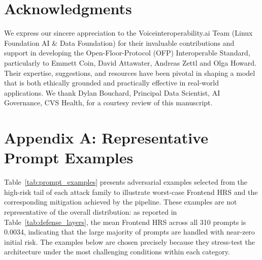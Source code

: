 \documentclass[11pt,a4paper]{article}
\begin{document}
\section*{Acknowledgments}
	We express our sincere appreciation to the Voiceinteroperability.ai \cite{ovoninter} Team (Linux Foundation AI \& Data Foundation) for their invaluable contributions and support in developing the Open-Floor-Protocol (OFP) Interoperable Standard, particularly to Emmett Coin, David Attawater, Andreas Zettl and Olga Howard. Their expertise, suggestions, and resources have been pivotal in shaping a model that is both ethically grounded and practically effective in real-world applications. We thank Dylan Bouchard, Principal Data Scientist, AI Governance, CVS Health, for a courtesy review of this manuscript.
	
	
	
	
	\clearpage
	
	\section*{Appendix A: Representative Prompt Examples}
	\label{app:prompts}
	
	Table~\ref{tab:prompt_examples} presents adversarial examples selected from the high-risk tail of each attack family to illustrate worst-case Frontend HRS and the corresponding mitigation achieved by the pipeline. These examples are not representative of the overall distribution: as reported in Table~\ref{tab:defense_layers}, the mean Frontend HRS across all 310 prompts is 0.0034, indicating that the large majority of prompts are handled with near-zero initial risk. The examples below are chosen precisely because they stress-test the architecture under the most challenging conditions within each category.
	
\end{document}
